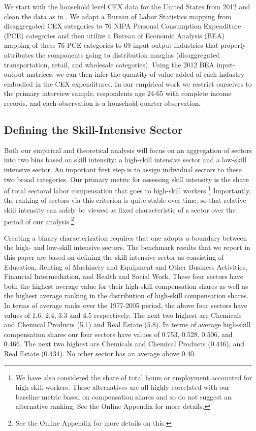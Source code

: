 \documentclass[12pt,english]{article}
\begin{document}
We start with the household level CEX data for the United States from 2012
and clean the data as in \citet{AguBil15}. We adapt a Bureau of Labor
Statistics mapping from disaggregated CEX categories to 76 NIPA Personal
Consumption Expenditure (PCE) categories and then utilize a Bureau of
Economic Analysis (BEA) mapping of these 76 PCE categories to 69
input-output industries that properly attributes the components going to
distribution margins (disaggregated transportation, retail, and wholesale
categories). Using the 2012 BEA input-output matrices, we can then infer the
quantity of value added of each industry embodied in the CEX expenditures.
In our empirical work we restrict ourselves to the primary interview sample,
respondents age 24-65 with complete income records, and each observation is
a household-quarter observation.

\subsection{Defining the Skill-Intensive Sector}

Both our empirical and theoretical analysis will focus on an aggregation of
sectors into two bins based on skill intensity: a high-skill intensive
sector and a low-skill intensive sector. An important first step is to
assign individual sectors to these two broad categories. Our primary metric
for assessing skill intensity is the share of total sectoral labor
compensation that goes to high-skill workers.\footnote{%
We have also considered the share of total hours or employment accounted for
high-skill workers. These alternatives are all highly correlated with our
baseline metric based on compensation shares and so do not suggest an
alternative ranking. See the Online Appendix for more details.} Importantly,
the ranking of sectors via this criterion is quite stable over time, so that
relative skill intensity can safely be viewed as fixed characteristic of a
sector over the period of our analysis.\footnote{%
See the Online Appendix for more details on this.}

Creating a binary characterization requires that one adopts a boundary
between the high- and low-skill intensive sectors. The benchmark results
that we report in this paper are based on defining the skill-intensive
sector as consisting of Education, Renting of Machinery and Equipment and
Other Business Activities, Financial Intermediation, and Health and Social
Work. These four sectors have both the highest average value for their
high-skill compensation shares as well as the highest average ranking in the
distribution of high-skill compensation shares. In terms of average ranks
over the 1977-2005 period, the above four sectors have values of 1.6, 2.4,
3.3 and 4.5 respectively. The next two highest are Chemicals and Chemical
Products (5.1) and Real Estate (5.8). In terms of average high-skill
compensation shares our four sectors have values of 0.753, 0.528, 0.506, and
0.466. The next two highest are Chemicals and Chemical Products (0.446), and
Real Estate (0.434). No other sector has an average above 0.40.
\end{document}
